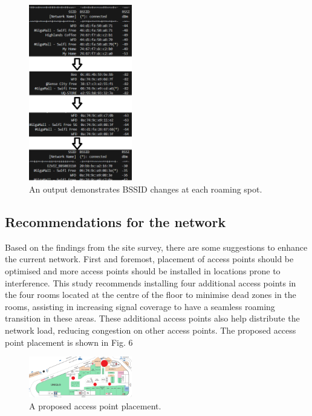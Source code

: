\documentclass[conference]{IEEEtran}
\begin{document}
\begin{figure}[htbp]
    \centering
    \includegraphics[width=0.4\textwidth]{rssid_change.png}
    \caption{An output demonstrates BSSID changes at each roaming spot.}
\end{figure}

\subsection{Recommendations for the network}

Based on the findings from the site survey, there are some suggestions to enhance the current network. First and foremost, placement of access points should be optimised and more access points should be installed in locations prone to interference. This study recommends installing four additional access points in the four rooms located at the centre of the floor to minimise dead zones in the rooms, assisting in increasing signal coverage to have a seamless roaming transition in these areas. These additional access points also help distribute the network load, reducing congestion on other access points. The proposed access point placement is shown in Fig. 6

\begin{figure}[htbp]
    \centering
    \includegraphics[width=0.4\textwidth]{acesspoint.png}
    \caption{A proposed access point placement.}
\end{figure}
\end{document}
